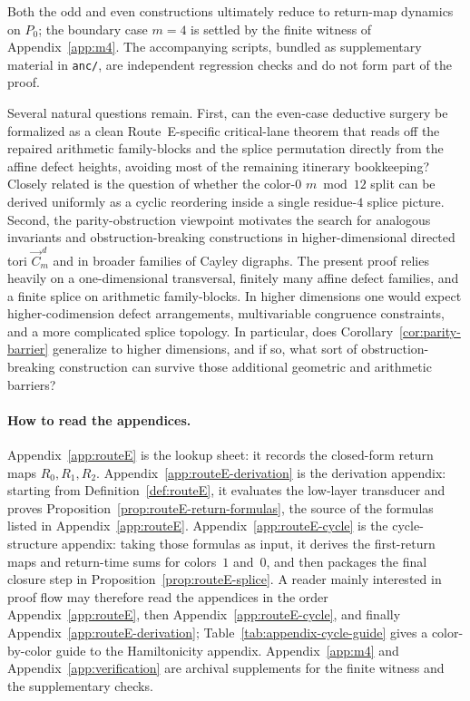 \documentclass[11pt]{article}
\begin{document}
Both the odd and even constructions ultimately reduce to return-map dynamics on $P_0$; the boundary case $m=4$ is settled by the finite witness of Appendix~\ref{app:m4}.
The accompanying scripts, bundled as supplementary material in \texttt{anc/}, are independent regression checks and do not form part of the proof.

Several natural questions remain.
First, can the even-case deductive surgery be formalized as a clean Route~E-specific critical-lane theorem that reads off the repaired arithmetic family-blocks and the splice permutation directly from the affine defect heights, avoiding most of the remaining itinerary bookkeeping?
Closely related is the question of whether the color-$0$ $m\bmod 12$ split can be derived uniformly as a cyclic reordering inside a single residue-$4$ splice picture.
Second, the parity-obstruction viewpoint motivates the search for analogous invariants and obstruction-breaking constructions in higher-dimensional directed tori $\vec C_m^{\,d}$ and in broader families of Cayley digraphs.
The present proof relies heavily on a one-dimensional transversal, finitely many affine defect families, and a finite splice on arithmetic family-blocks.
In higher dimensions one would expect higher-codimension defect arrangements, multivariable congruence constraints, and a more complicated splice topology.
In particular, does Corollary~\ref{cor:parity-barrier} generalize to higher dimensions, and if so, what sort of obstruction-breaking construction can survive those additional geometric and arithmetic barriers?

\appendix

\paragraph{How to read the appendices.}
Appendix~\ref{app:routeE} is the lookup sheet: it records the closed-form return maps $R_0,R_1,R_2$.
Appendix~\ref{app:routeE-derivation} is the derivation appendix: starting from Definition~\ref{def:routeE}, it evaluates the low-layer transducer and proves Proposition~\ref{prop:routeE-return-formulas}, the source of the formulas listed in Appendix~\ref{app:routeE}.
Appendix~\ref{app:routeE-cycle} is the cycle-structure appendix: taking those formulas as input, it derives the first-return maps and return-time sums for colors~$1$ and~$0$, and then packages the final closure step in Proposition~\ref{prop:routeE-splice}.
A reader mainly interested in proof flow may therefore read the appendices in the order Appendix~\ref{app:routeE}, then Appendix~\ref{app:routeE-cycle}, and finally Appendix~\ref{app:routeE-derivation}; Table~\ref{tab:appendix-cycle-guide} gives a color-by-color guide to the Hamiltonicity appendix.
Appendix~\ref{app:m4} and Appendix~\ref{app:verification} are archival supplements for the finite witness and the supplementary checks.
\end{document}
